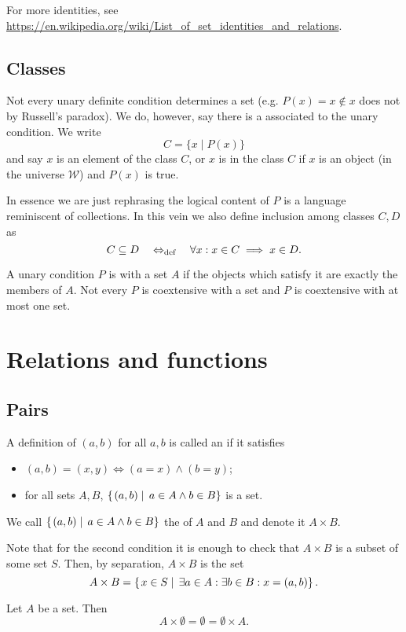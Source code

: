 For more identities, see \url{https://en.wikipedia.org/wiki/List_of_set_identities_and_relations}.

\section{Classes}
Not every unary definite condition determines a set (e.g. $P(x) = x\notin x$ does not by Russell's paradox). We do, however, say there is a  associated to the unary condition. We write
\[ C = \{ x\;|\; P(x) \} \]
and say $x$ is an element of the class $C$, or $x$ is in the class $C$ if $x$ is an object (in the universe $\mathcal{W}$) and $P(x)$ is true.

In essence we are just rephrasing the logical content of $P$ is a language reminiscent of collections. In this vein we also define inclusion among classes $C,D$ as
\[ C\subseteq D \quad\Leftrightarrow_{\text{def}}\quad \forall x: x\in C \implies x\in D. \]

A unary condition $P$ is  with a set $A$ if the objects which satisfy it are exactly the members of $A$. Not every $P$ is coextensive with a set and $P$ is coextensive with at most one set.

\chapter{Relations and functions}
\section{Pairs}
\begin{definition}
A definition of $(a,b)$ for all $a,b$ is called an  if it satisfies
\begin{itemize}
\item $(a,b) = (x,y) \iff (a=x)\land (b=y)$;
\item for all sets $A,B$, $\left\{\left. (a,b) \;\right|\; a\in A\land b\in B \right\}$ is a set.
\end{itemize}
We call $\left\{\left. (a,b) \;\right|\; a\in A\land b\in B \right\}$ the  of $A$ and $B$ and denote it $A\times B$.
\end{definition}
Note that for the second condition it is enough to check that $A\times B$ is a subset of some set $S$. Then, by separation, $A\times B$ is the set
\[ A\times B = \left\{\left. x\in S \;\right|\; \exists a\in A:\exists b\in B: x = (a,b) \right\}. \]

\begin{lemma}
Let $A$ be a set. Then
\[ A\times \emptyset = \emptyset = \emptyset\times A. \]
\end{lemma}

